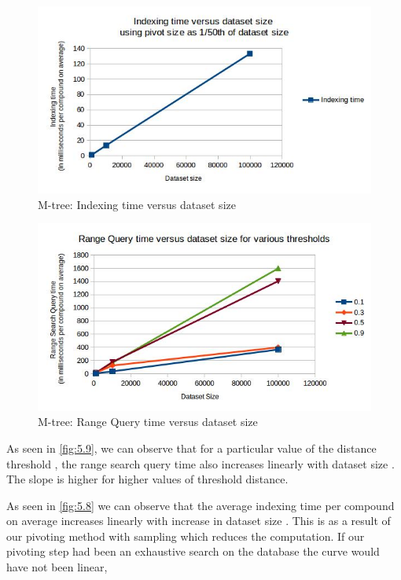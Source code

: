 \begin{figure}[ht!]	
\centering
\includegraphics[width=1 \columnwidth]{img/image6.jpg}
\caption{M-tree: Indexing time versus dataset size}
\label{fig:5.8}
\end{figure}

\begin{figure}[ht!]	
\centering
\includegraphics[width=1 \columnwidth]{img/image9.jpg}
\caption{M-tree: Range Query time versus dataset size}
\label{fig:5.9}
\end{figure}


As seen in \autoref{fig:5.9}, we can observe that for a particular value of the distance threshold , the range search query time also increases linearly with dataset size . The slope is higher for higher values of threshold distance.

As seen in \autoref{fig:5.8} we can observe that the average indexing time per compound on average increases linearly with increase in dataset size . This is as a result of our pivoting method with sampling which reduces the computation. If our pivoting step had been an exhaustive search on the database the curve would have not been linear, 





